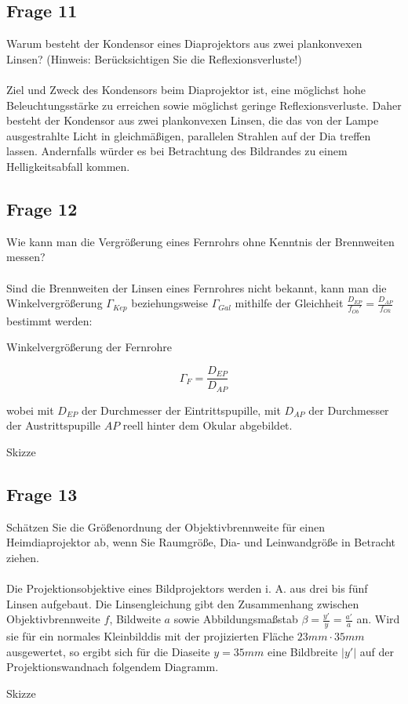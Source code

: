 \documentclass[a4paper,10pt]{scrartcl}
\begin{document}
	\subsection{Frage 11}
		Warum besteht der Kondensor eines Diaprojektors aus zwei plankonvexen Linsen? (Hinweis: Berücksichtigen Sie die Reflexionsverluste!)
		\\
		\\
		Ziel und Zweck des Kondensors beim Diaprojektor ist, eine möglichst hohe Beleuchtungsstärke zu erreichen sowie möglichst geringe Reflexionsverluste. Daher besteht der Kondensor aus zwei plankonvexen Linsen, die das von der Lampe ausgestrahlte Licht in gleichmäßigen, parallelen Strahlen auf der Dia treffen lassen. Andernfalls würder es bei Betrachtung des Bildrandes zu einem Helligkeitsabfall kommen.
	\subsection{Frage 12}
		Wie kann man die Vergrößerung eines Fernrohrs ohne Kenntnis der Brennweiten messen?
		\\
		\\
		Sind die Brennweiten der Linsen eines Fernrohres nicht bekannt, kann man die Winkelvergrößerung $\Gamma_{Kep}$ beziehungsweise $\Gamma_{Gal}$ mithilfe der Gleichheit $\frac{D_{EP}}{f_{Ob}'}=\frac{D_{AP}}{f_{Ok}}$ bestimmt werden:
	
		Winkelvergrößerung der Fernrohre

			\[\Gamma_F=\frac{D_{EP}}{D_{AP}}\]
	
		wobei mit $D_{EP}$ der Durchmesser der Eintrittspupille, mit $D_{AP}$ der Durchmesser der Austrittspupille $AP$ reell hinter dem Okular abgebildet.
		
			\begin{center}
			Skizze
			\end{center}
	\subsection{Frage 13}
		Schätzen Sie die Größenordnung der Objektivbrennweite für einen Heimdiaprojektor ab, wenn Sie Raumgröße, Dia- und Leinwandgröße in Betracht ziehen.
		\\
		\\
		Die Projektionsobjektive eines Bildprojektors werden i. A. aus drei bis fünf Linsen aufgebaut. Die Linsengleichung gibt den Zusammenhang zwischen Objektivbrennweite $f$, Bildweite $a$ sowie Abbildungsmaßstab $\beta=\frac{y'}{y}=\frac{a'}{a}$ an. Wird sie für ein normales Kleinbilddis mit der projizierten Fläche $23 mm \cdot 35 mm$ ausgewertet, so ergibt sich für die Diaseite $y=35 mm$ eine Bildbreite $\left|y'\right|$ auf der Projektionswandnach folgendem Diagramm.
	
			\begin{center}
			Skizze
			\end{center}
		
	
\end{document}
